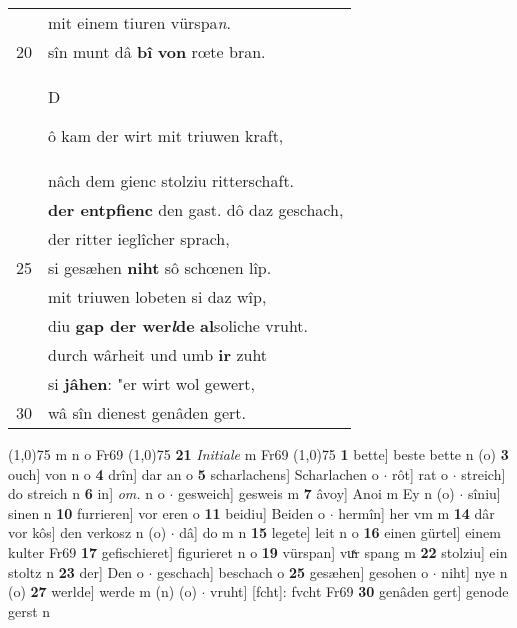 \documentclass[8pt,a4paper,notitlepage]{article}
\begin{document}
\begin{table}[ht]
\begin{minipage}[t]{0.5\linewidth}
\begin{tabular}{rl}
 & mit einem tiuren vürspa\textit{n}.\\ 
20 & sîn munt dâ \textbf{bî} \textbf{von} rœte bran.\\ 
 & \begin{large}D\end{large}ô kam der wirt mit triuwen kraft,\\ 
 & nâch dem gienc stolziu ritterschaft.\\ 
 & \textbf{der entpfienc} den gast. dô daz geschach,\\ 
 & der ritter ieglîcher sprach,\\ 
25 & si gesæhen \textbf{niht} sô schœnen lîp.\\ 
 & mit triuwen lobeten si daz wîp,\\ 
 & diu \textbf{gap der wer\textit{l}de} \textbf{al}soliche vruht.\\ 
 & durch wârheit und umb \textbf{ir} zuht\\ 
 & si \textbf{jâhen}: "er wirt wol gewert,\\ 
30 & wâ sîn dienest genâden gert.\\ 
\end{tabular}
\scriptsize
\line(1,0){75} \newline
m n o Fr69 \newline
\line(1,0){75} \newline
\textbf{21} \textit{Initiale} m Fr69  \newline
\line(1,0){75} \newline
\textbf{1} bette] beste bette n (o) \textbf{3} ouch] von n o \textbf{4} drîn] dar an o \textbf{5} scharlachens] Scharlachen o  $\cdot$ rôt] rat o  $\cdot$ streich] do streich n \textbf{6} in] \textit{om.} n o  $\cdot$ gesweich] gesweis m \textbf{7} âvoy] Anoi m Ey n (o)  $\cdot$ sîniu] sinen n \textbf{10} furrieren] vor eren o \textbf{11} beidiu] Beiden o  $\cdot$ hermîn] her vm m \textbf{14} dâr vor kôs] den verkosz n (o)  $\cdot$ dâ] do m n \textbf{15} legete] leit n o \textbf{16} einen gürtel] einem kulter Fr69 \textbf{17} gefischieret] figurieret n o \textbf{19} vürspan] vuͯr spang m \textbf{22} stolziu] ein stoltz n \textbf{23} der] Den o  $\cdot$ geschach] beschach o \textbf{25} gesæhen] gesohen o  $\cdot$ niht] nye n (o) \textbf{27} werlde] werde m (n) (o)  $\cdot$ vruht] [fcht]: fvcht Fr69 \textbf{30} genâden gert] genode gerst n \newline
\end{minipage}
\end{table}
\newpage
\end{document}
